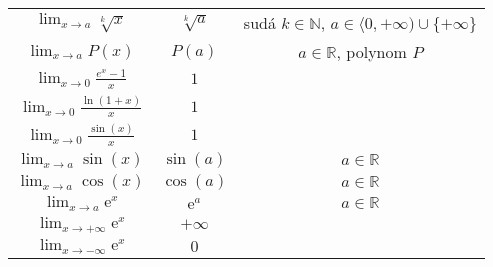 \begin{minipage}{\linewidth}
\begin{tabular}{|c|c|c|}
        $\displaystyle\lim_{x\to a} \sqrt[k]{x}$                              & $\sqrt[k]{a}$                                                                          & sudá $k \in \mathbb{N}$, $a \in \langle 0, +\infty) \cup \{+\infty\}$ \\
        $\displaystyle\lim_{x\to a} P(x)$                                     & $P(a)$                                                                                 & $a \in \mathbb{R}$, polynom $P$                                    \\
        $\displaystyle\lim_{x\to0} \frac{e^x - 1}{x}$                         & $1$                                                                                    &                                                                       \\
        $\displaystyle\lim_{x\to0} \frac{\ln(1+x)}{x}$                        & $1$                                                                                    &                                                                       \\
        $\displaystyle\lim_{x\to0} \frac{\sin(x)}{x}$                         & $1$                                                                                    &                                                                       \\
        $\displaystyle\lim_{x\to a} \sin(x)$                                  & $\sin(a)$                                                                              & $a \in \mathbb{R}$                                                    \\
        $\displaystyle\lim_{x\to a} \cos(x)$                                  & $\cos(a)$                                                                              & $a \in \mathbb{R}$                                                    \\
        $\displaystyle\lim_{x\to a} \mathrm{e}^x$                             & $\mathrm{e}^a$                                                                         & $a \in \mathbb{R}$                                                    \\
        $\displaystyle\lim_{x\to +\infty} \mathrm{e}^x$                       & $+\infty$                                                                              &                                                                       \\
        $\displaystyle\lim_{x\to -\infty} \mathrm{e}^x$                       & $0$                                                                                    &                                                                       \\

\end{tabular}
\end{minipage}
